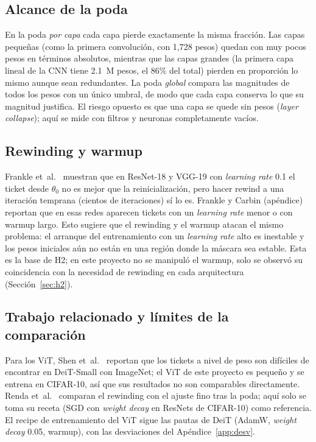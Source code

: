 \documentclass[11pt]{article}
\begin{document}
\subsection{Alcance de la poda}
En la poda \textit{por capa} cada capa pierde exactamente la misma fracción. Las capas pequeñas (como la primera convolución, con 1,728 pesos) quedan con muy pocos pesos en términos absolutos, mientras que las capas grandes (la primera capa lineal de la CNN tiene 2.1~M pesos, el 86\% del total) pierden en proporción lo mismo aunque sean redundantes. La poda \textit{global} compara las magnitudes de todos los pesos con un único umbral, de modo que cada capa conserva lo que su magnitud justifica. El riesgo opuesto es que una capa se quede sin pesos (\textit{layer collapse}); aquí se mide con filtros y neuronas completamente vacíos.

\subsection{Rewinding y warmup}
Frankle et~al.\ \cite{frankle2019stabilizing} muestran que en ResNet-18 y VGG-19 con \textit{learning rate} 0.1 el ticket desde $\theta_0$ no es mejor que la reinicialización, pero hacer rewind a una iteración temprana (cientos de iteraciones) sí lo es. Frankle y Carbin \cite{frankle2019lth} (apéndice) reportan que en esas redes aparecen tickets con un \textit{learning rate} menor o con warmup largo. Esto sugiere que el rewinding y el warmup atacan el mismo problema: el arranque del entrenamiento con un \textit{learning rate} alto es inestable y los pesos iniciales aún no están en una región donde la máscara sea estable. Esta es la base de H2; en este proyecto no se manipuló el warmup, solo se observó su coincidencia con la necesidad de rewinding en cada arquitectura (Sección~\ref{sec:h2}).

\subsection{Trabajo relacionado y límites de la comparación}
Para los ViT, Shen et~al.\ \cite{shen2023dlth} reportan que los tickets a nivel de peso son difíciles de encontrar en DeiT-Small con ImageNet; el ViT de este proyecto es pequeño y se entrena en CIFAR-10, así que sus resultados no son comparables directamente. Renda et~al.\ \cite{renda2020} comparan el rewinding con el ajuste fino tras la poda; aquí solo se toma su receta (SGD con \textit{weight decay} en ResNets de CIFAR-10) como referencia. El recipe de entrenamiento del ViT sigue las pautas de DeiT \cite{touvron2021deit} (AdamW, \textit{weight decay} 0.05, warmup), con las desviaciones del Apéndice~\ref{app:desv}.
\end{document}
